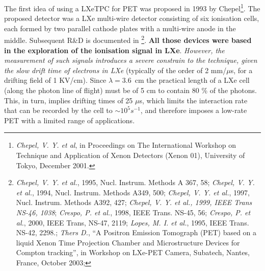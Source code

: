 \documentclass{JINST}
\begin{document}
The first idea of using a LXeTPC for PET was proposed in 1993 by Chepel\footnote{{\em Chepel, V. Y. et al}, in Proceedings on The International
Workshop on Technique and Application of Xenon Detectors (Xenon 01), University of Tokyo, December 2001.}. The proposed detector was a LXe multi-wire detector consisting of six ionisation cells, each formed by two parallel cathode plates with a multi-wire anode in the middle. 
Subsequent R\&D is documented in \footnote{{\em Chepel, V. Y. et al.}, 1995, Nucl. Instrum. Methods A
367, 58; {\em Chepel, V. Y. et al.}, 1994, Nucl. Instrum. Methods
A349, 500; {\em Chepel, V. Y. et al.}, 1997, Nucl. Instrum. Methods A392, 427; {\em Chepel, V. Y. et al., 1999, IEEE Trans NS-46, 1038}; {\em Crespo, P. et al.}, 1998, IEEE Trans. NS-45, 56; {\em Crespo, P. et al.}, 2000, IEEE Trans, NS-47, 2119; {\em Lopes, M. I. et al.}, 1995, IEEE Trans. NS-42, 2298.; {\em Thers D.}, ``A Positron Emission Tomograph (PET)
based on a liquid Xenon Time Projection Chamber and Microstructure Devices for Compton tracking'', in Workshop on LXe-PET Camera, Subatech, Nantes, France, October 2003; }. {\bf All those devices were based in the exploration of the ionisation signal in LXe}. {\em However, the measurement of such signals introduces a severe constrain to the technique, given the slow drift time of electrons in LXe} (typically of the order of 2 mm/$\mu$s, for a drifting field of 
1 KV/cm). Since $\lambda = 3$.6~cm the practical length of a LXe cell (along the photon line of flight) must be of 5 cm to contain 80 \% of the photons. This, in turn, implies drifting times of 25 $\mu$s, which limits the interaction rate that can be recorded by the cell to  
$\sim10^5 s^{-1}$, and therefore imposes a low-rate PET with a limited range of applications. 
\end{document}
